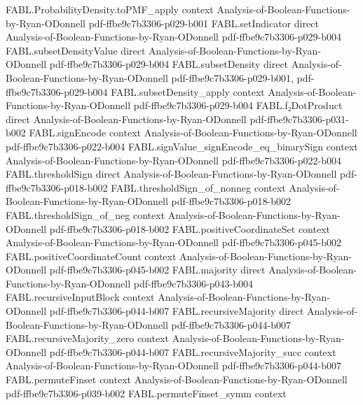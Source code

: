 \begin{theorem}
\proofstep
  {FABL.ProbabilityDensity.toPMF_apply}
  {context}
  {Analysis-of-Boolean-Functions-by-Ryan-ODonnell}
  {pdf-ffbe9c7b3306-p029-b001}
\proofstep
  {FABL.setIndicator}
  {direct}
  {Analysis-of-Boolean-Functions-by-Ryan-ODonnell}
  {pdf-ffbe9c7b3306-p029-b004}
\proofstep
  {FABL.subsetDensityValue}
  {direct}
  {Analysis-of-Boolean-Functions-by-Ryan-ODonnell}
  {pdf-ffbe9c7b3306-p029-b004}
\proofstep
  {FABL.subsetDensity}
  {direct}
  {Analysis-of-Boolean-Functions-by-Ryan-ODonnell}
  {pdf-ffbe9c7b3306-p029-b001,
    pdf-ffbe9c7b3306-p029-b004}
\proofstep
  {FABL.subsetDensity_apply}
  {context}
  {Analysis-of-Boolean-Functions-by-Ryan-ODonnell}
  {pdf-ffbe9c7b3306-p029-b004}
\proofstep
  {FABL.f₂DotProduct}
  {direct}
  {Analysis-of-Boolean-Functions-by-Ryan-ODonnell}
  {pdf-ffbe9c7b3306-p031-b002}
\proofstep
  {FABL.signEncode}
  {context}
  {Analysis-of-Boolean-Functions-by-Ryan-ODonnell}
  {pdf-ffbe9c7b3306-p022-b004}
\proofstep
  {FABL.signValue_signEncode_eq_binarySign}
  {context}
  {Analysis-of-Boolean-Functions-by-Ryan-ODonnell}
  {pdf-ffbe9c7b3306-p022-b004}
\proofstep
  {FABL.thresholdSign}
  {direct}
  {Analysis-of-Boolean-Functions-by-Ryan-ODonnell}
  {pdf-ffbe9c7b3306-p018-b002}
\proofstep
  {FABL.thresholdSign_of_nonneg}
  {context}
  {Analysis-of-Boolean-Functions-by-Ryan-ODonnell}
  {pdf-ffbe9c7b3306-p018-b002}
\proofstep
  {FABL.thresholdSign_of_neg}
  {context}
  {Analysis-of-Boolean-Functions-by-Ryan-ODonnell}
  {pdf-ffbe9c7b3306-p018-b002}
\proofstep
  {FABL.positiveCoordinateSet}
  {context}
  {Analysis-of-Boolean-Functions-by-Ryan-ODonnell}
  {pdf-ffbe9c7b3306-p045-b002}
\proofstep
  {FABL.positiveCoordinateCount}
  {context}
  {Analysis-of-Boolean-Functions-by-Ryan-ODonnell}
  {pdf-ffbe9c7b3306-p045-b002}
\proofstep
  {FABL.majority}
  {direct}
  {Analysis-of-Boolean-Functions-by-Ryan-ODonnell}
  {pdf-ffbe9c7b3306-p043-b004}
\proofstep
  {FABL.recursiveInputBlock}
  {context}
  {Analysis-of-Boolean-Functions-by-Ryan-ODonnell}
  {pdf-ffbe9c7b3306-p044-b007}
\proofstep
  {FABL.recursiveMajority}
  {direct}
  {Analysis-of-Boolean-Functions-by-Ryan-ODonnell}
  {pdf-ffbe9c7b3306-p044-b007}
\proofstep
  {FABL.recursiveMajority_zero}
  {context}
  {Analysis-of-Boolean-Functions-by-Ryan-ODonnell}
  {pdf-ffbe9c7b3306-p044-b007}
\proofstep
  {FABL.recursiveMajority_succ}
  {context}
  {Analysis-of-Boolean-Functions-by-Ryan-ODonnell}
  {pdf-ffbe9c7b3306-p044-b007}
\proofstep
  {FABL.permuteFinset}
  {context}
  {Analysis-of-Boolean-Functions-by-Ryan-ODonnell}
  {pdf-ffbe9c7b3306-p039-b002}
\proofstep
  {FABL.permuteFinset_symm}
  {context}

\end{theorem}
